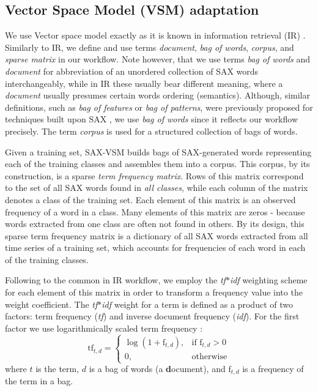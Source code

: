 \documentclass{llncs}
\begin{document}
\subsection{Vector Space Model (VSM) adaptation}
We use Vector space model exactly as it is known in information retrieval (IR) \cite{salton}. 
Similarly to IR, we define and use terms \textit{document}, \textit{bag of words}, 
\textit{corpus}, and \textit{sparse matrix} in our workflow. 
Note however, that we use terms \textit{bag of words} and \textit{document} 
for abbreviation of an unordered collection of SAX words interchangeably, while 
in IR these usually bear different meaning, where a \textit{document} usually 
presumes certain words ordering (semantics). 
Although, similar definitions, such as \textit{bag of features} or 
\textit{bag of patterns}, were previously proposed for techniques built upon 
SAX \cite{bag_patterns}, we use \textit{bag of words} since it reflects our 
workflow precisely. The term \textit{corpus} is used for a structured collection 
of bags of words. 

Given a training set, SAX-VSM builds bags of SAX-generated words representing 
each of the training classes and assembles them into a corpus. 
This corpus, by its construction, is a sparse \textit{term frequency matrix}. 
Rows of this matrix correspond to the set of all SAX words found in 
\textit{all classes}, while each column of the matrix denotes a class of the 
training set. Each element of this matrix is an observed frequency of a word
in a class. 
Many elements of this matrix are zeros - because words extracted from one class 
are often not found in others.
By its design, this sparse 
term frequency matrix is a dictionary of all SAX words extracted from all time 
series of a training set, which accounts for frequencies of each word in each of 
the training classes.

Following to the common in IR workflow, we employ the \textit{tf$\ast$idf} weighting 
scheme for each element of this matrix in order to transform a frequency value into
the weight coefficient. 
The \textit{tf$\ast$idf} weight for a term is defined as a 
product of two factors: term frequency (\textit{tf}) and inverse document 
frequency (\textit{idf}). 
For the first factor we use logarithmically scaled term frequency \cite{logtf}:
\begin{equation}
 \mbox{tf}_{t, d} =  \begin{cases} \log(1 + \mbox{f}_{t,d}), &\mbox{if f}_{t,d}>0  \\
0, & \mbox{otherwise} \end{cases}
\end{equation} 
where $t$ is the term, $d$ is a bag of words (a \textbf{d}ocument), and $\mbox{f}_{t,d}$ 
is a frequency of the term in a bag.
\end{document}
